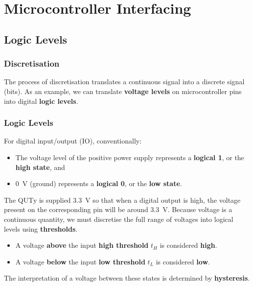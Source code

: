 \documentclass[a4paper]{report}
\begin{document}
\chapter{Microcontroller Interfacing}
\section{Logic Levels}
\subsection{Discretisation}
The process of discretisation translates a continuous signal into a discrete signal (bits).
As an example, we can translate \textbf{voltage levels} on microcontroller pins into digital \textbf{logic levels}.
\subsection{Logic Levels}
For digital input/output (IO), conventionally:
\begin{itemize}
    \item The voltage level of the positive power supply represents a \textbf{logical 1}, or the \textbf{high state}, and
    \item \qty{0}{V} (ground) represents a \textbf{logical 0}, or the \textbf{low state}.
\end{itemize}
The QUTy is supplied \qty{3.3}{V} so that when a digital output is high,
the voltage present on the corresponding pin will be around \qty{3.3}{V}.
Because voltage is a continuous quantity, we must discretise the full range of voltages into logical levels using \textbf{thresholds}.
\begin{itemize}
    \item A voltage \textbf{above} the input \textbf{high threshold} \(t_H\) is considered \textbf{high}.
    \item A voltage \textbf{below} the input \textbf{low threshold} \(t_L\) is considered \textbf{low}.
\end{itemize}
The interpretation of a voltage between these states is determined by \textbf{hysteresis}.
\end{document}
